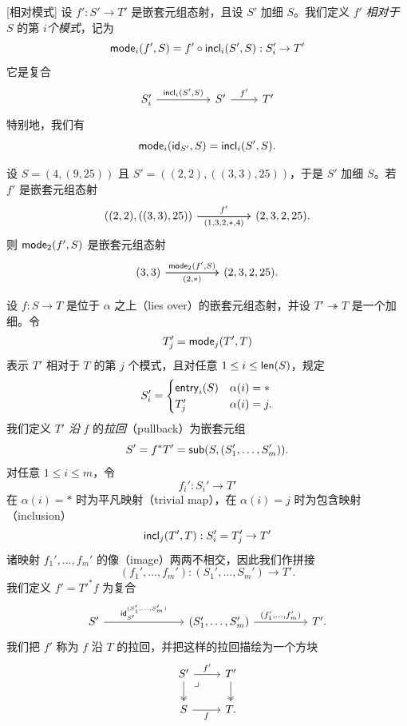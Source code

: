 \begin{construction}\label{definitionofrelativemodes}[相对模式]
    设 $f':S' \to T'$ 是嵌套元组态射，且设 $S'$ 加细 $S$。我们定义 $f'$ {\it 相对于} $S$ 的第 $i${\it 个模式}，记为
    \[
    \mathsf{mode}_i(f',S) = f' \circ \mathsf{incl}_i(S',S): S_i' \to T'
    \]
    它是复合
    \[
    \begin{tikzcd} S_i' \ar[rr ,"\incl_i(S'{,}S)"] & & S' \ar[r,"f'"] &  T'
    \end{tikzcd}
    \]
    特别地，我们有
    \[
    \mathsf{mode}_i(\mathsf{id}_{S'},S) = \mathsf{incl}_i(S',S).
    \]
\end{construction}

\begin{example}
    设 $S = (4,(9,25))$ 且 $S' = ((2,2),((3,3),25))$，于是 $S'$ 加细 $S$。若 $f'$ 是嵌套元组态射
    \[ \begin{tikzcd}
    ((2,2),((3,3),25)) \ar[rr,"f'"] \ar[rr,swap,"(1{,}3{,}2{,}*{,}4)"] & & (2,3,2,25).
    \end{tikzcd} \]
    则 $\mathsf{mode}_2(f',S)$ 是嵌套元组态射
    \[ \begin{tikzcd}
    (3,3) \ar[rr,"\mode_2(f'{,}S)"] \ar[rr,swap,"(2{,}*)"] & & (2,3,2,25).
    \end{tikzcd} \]
\end{example}





\begin{construction}[拉回]
    设 $f:S \to T$ 是位于 $\alpha$ 之上（lies over）的嵌套元组态射，并设 $T' \twoheadrightarrow T$ 是一个加细。令
    \[
    T_j' = \mathsf{mode}_j(T',T)
    \]
    表示 $T'$ 相对于 $T$ 的第 $j$ 个模式，且对任意 $1 \leq i \leq \mathsf{len}(S)$，规定
    \[
    S_i' =
    \begin{cases}
    \mathsf{entry}_i(S) & \alpha(i) = *\\
    T'_j & \alpha(i) = j.
    \end{cases}
    \]
    我们定义 $T'$ {\it 沿} $f$ 的{\it 拉回}（pullback）为嵌套元组
    \[
    S' = f^*T' = \mathsf{sub}(S,(S_1',\dots,S_m')).
    \]
    对任意 $1 \leq i \leq m$，令
    \[
    f_i' :S_i' \to T'
    \]
    在 $\alpha(i) = *$ 时为平凡映射（trivial map），在 $\alpha(i) = j$ 时为包含映射（inclusion）
    \[
    \mathsf{incl}_j(T',T):S_i' = T_j' \to T'
    \]
    诸映射 $f_1',\dots,f_m'$ 的像（image）两两不相交，因此我们作拼接
    \[
    (f_1',\dots,f_m') : (S_1',\dots,S_m') \to T'.
    \]
    我们定义 $f' = T'^*f$ 为复合
    \[ \begin{tikzcd}
    S' \ar[rrr,"\id_{S'}^{(S_1'{,}\dots{,}S_m')}"] & & &  (S_1',\dots,S_m') \ar[rr,"(f_1'{,}\dots{,}f_m')"] & & T'.
    \end{tikzcd} \]
    我们把 $f'$ 称为 $f$ 沿 $T$ 的拉回，并把这样的拉回描绘为一个方块
    \[ \begin{tikzcd}
    S' \ar[r,"f'"] \ar[d, two heads] \arrow[dr, phantom, "\lrcorner", very near start] & T' \ar[d,two heads] \\
    S \ar[r,swap,"f"] & T.
    \end{tikzcd} \]
\end{construction}

